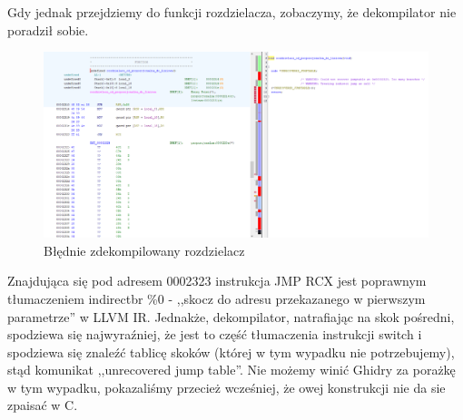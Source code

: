 Gdy jednak przejdziemy do funkcji rozdzielacza, zobaczymy, że dekompilator nie poradził sobie.
\begin{figure}[H]
    \centering
    \includegraphics[width=1.2\textwidth]{images/2.rozdzielacz/2.png}
    \caption{Błędnie zdekompilowany rozdzielacz}
\end{figure}

Znajdująca się pod adresem 0002323 instrukcja JMP RCX jest poprawnym tłumaczeniem indirectbr \%0 - ,,skocz do adresu przekazanego w pierwszym parametrze'' w LLVM IR. Jednakże, dekompilator, natrafiając na skok pośredni, spodziewa się najwyraźniej, że jest to część tłumaczenia instrukcji switch i spodziewa się znaleźć tablicę skoków (której w tym wypadku nie potrzebujemy), stąd komunikat ,,unrecovered jump table''. Nie możemy winić Ghidry za porażkę w tym wypadku, pokazaliśmy przecież wcześniej, że owej konstrukcji nie da sie zpaisać w C.

